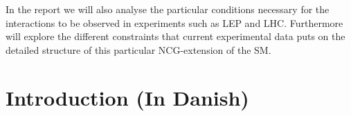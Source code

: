 In the report we will also analyse the particular conditions necessary for the interactions to be observed in experiments such as LEP and LHC. Furthermore will explore the different constraints that current experimental data puts on the detailed structure of this particular NCG-extension of the SM.

\section{Introduction (In Danish)}